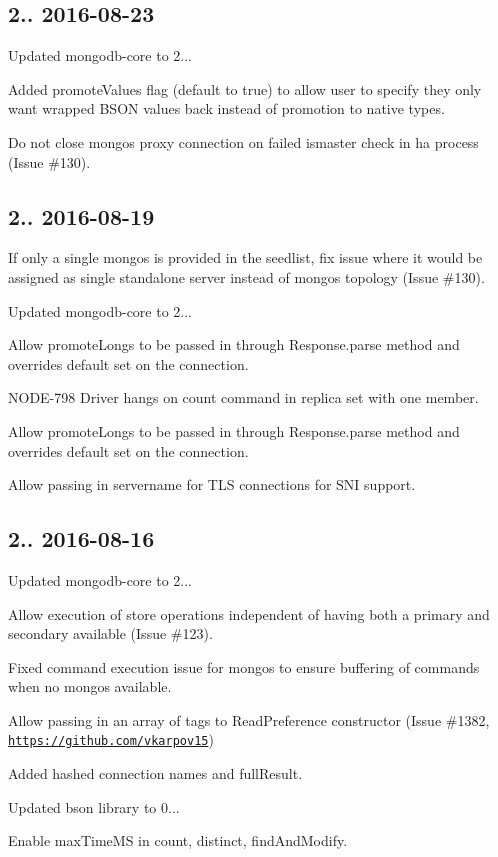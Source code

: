 \subsection*{2.. 2016-\/08-\/23 }


\begin{DoxyItemize}
\item Updated mongodb-\/core to 2...
\item Added promote\+Values flag (default to true) to allow user to specify they only want wrapped B\+S\+ON values back instead of promotion to native types.
\item Do not close mongos proxy connection on failed ismaster check in ha process (Issue \#130).
\end{DoxyItemize}

\subsection*{2.. 2016-\/08-\/19 }


\begin{DoxyItemize}
\item If only a single mongos is provided in the seedlist, fix issue where it would be assigned as single standalone server instead of mongos topology (Issue \#130).
\item Updated mongodb-\/core to 2...
\item Allow promote\+Longs to be passed in through Response.\+parse method and overrides default set on the connection.
\item N\+O\+D\+E-\/798 Driver hangs on count command in replica set with one member.
\item Allow promote\+Longs to be passed in through Response.\+parse method and overrides default set on the connection.
\item Allow passing in servername for T\+LS connections for S\+NI support.
\end{DoxyItemize}

\subsection*{2.. 2016-\/08-\/16 }


\begin{DoxyItemize}
\item Updated mongodb-\/core to 2...
\item Allow execution of store operations independent of having both a primary and secondary available (Issue \#123).
\item Fixed command execution issue for mongos to ensure buffering of commands when no mongos available.
\item Allow passing in an array of tags to Read\+Preference constructor (Issue \#1382, \href{https://github.com/vkarpov15}{\tt https\+://github.\+com/vkarpov15})
\item Added hashed connection names and full\+Result.
\item Updated bson library to 0...
\item Enable max\+Time\+MS in count, distinct, find\+And\+Modify.
\end{DoxyItemize}

